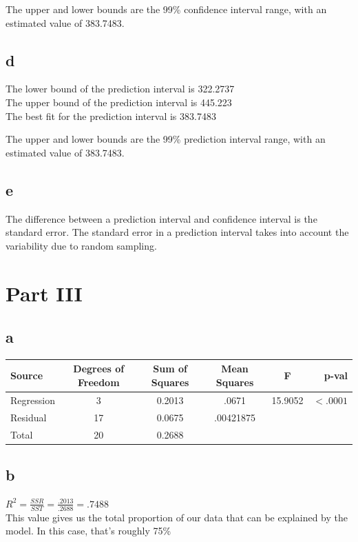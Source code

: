 \documentclass[10pt,letterpaper]{article}
\begin{document}
The upper and lower bounds are the 99\% confidence interval range, with an
estimated value of 383.7483.

\subsection*{d}
The lower bound of the prediction interval is 322.2737\\
The upper bound of the prediction interval is 445.223\\
The best fit for the prediction interval is 383.7483\

The upper and lower bounds are the 99\% prediction interval range, with an
estimated value of 383.7483.

\subsection*{e}
The difference between a prediction interval and confidence interval is the
standard error. The standard error in a prediction interval takes into account
the variability due to random sampling.

\section*{Part III}
\subsection*{a}
\begin{center}
	\begin{tabular}{| l | c | c | c | c | r |}
		\hline
		Source & Degrees of Freedom & Sum of Squares & Mean Squares & F & p-val \\ \hline
		Regression & 3 & 0.2013 & .0671 & 15.9052 & $<.0001$\\ \hline
		Residual & 17 & 0.0675 & .00421875  & & \\ \hline
		Total & 20 & 0.2688 & & & \\ \hline
	\end{tabular}
\end{center}
\subsection*{b}
$R^2=\frac{SSR}{SST}=\frac{.2013}{.2688}=.7488$\\
This value gives us the total proportion of our data that can be explained by the model.
In this case, that's roughly 75\%
\end{document}
